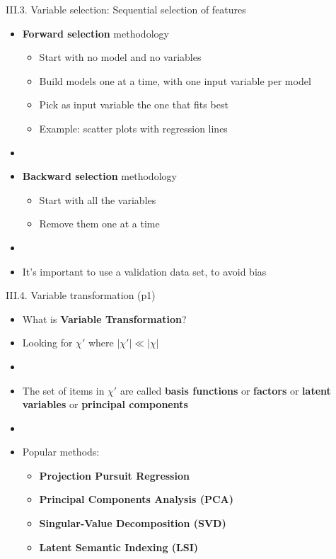 \documentclass[handout]{beamer}
\newcommand{\stronger}[1]{\textbf{\color{purple} #1}}
\begin{document}
\begin{frame}{III.3. Variable selection: Sequential selection of features}
\begin{itemize}
\item \stronger{Forward selection} methodology
	\begin{itemize}
	\item Start with no model and no variables
	\item Build models one at a time, with one input variable per model
	\item Pick as input variable the one that fits best
	\item Example: scatter plots with regression lines
	\end{itemize}
\item[]
\item \stronger{Backward selection} methodology
	\begin{itemize}
	\item Start with all the variables
	\item Remove them one at a time
	\end{itemize}
\item[]
\item It's important to use a validation data set, to avoid bias
\end{itemize}
\end{frame}
\begin{frame}{III.4. Variable transformation (p1)}
\begin{itemize}
\item What is \stronger{Variable Transformation}?
\item[] Looking for $\chi'$ where $|\chi'| \ll |\chi|$
\item[]
\item The set of items in $\chi'$ are called \stronger{basis functions} or \stronger{factors} or \stronger{latent variables} or \stronger{principal components}
\item[]
\item Popular methods:
	\begin{itemize}
	\item \stronger{Projection Pursuit Regression}
	\item \stronger{Principal Components Analysis (PCA)}
	\item \stronger{Singular-Value Decomposition (SVD)}
	\item \stronger{Latent Semantic Indexing (LSI)}
	\end{itemize}
\end{itemize}
\end{frame}
\end{document}
